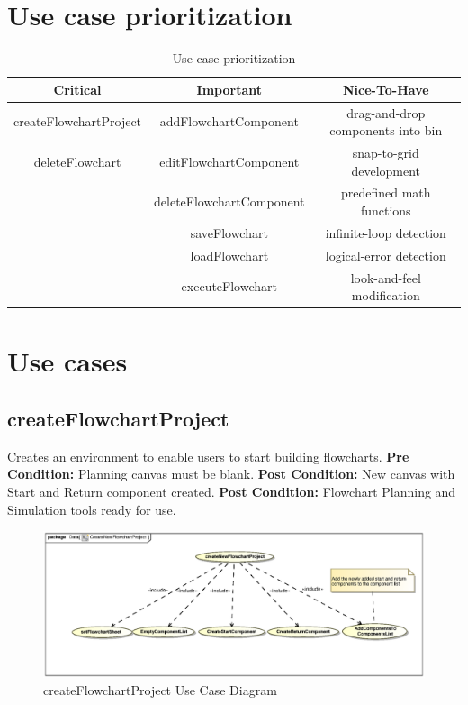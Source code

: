 \documentclass[11pt,a4paper,titlepage]{article}
\begin{document}
\newpage	
\section{Use case prioritization}


\begin{table}[h!]   
    \label{tab:table1}
    \begin{tabular}{ccc}
      \toprule
      Critical & Important & Nice-To-Have\\
      \midrule	
      createFlowchartProject & addFlowchartComponent &  drag-and-drop components into bin\\
      deleteFlowchart & editFlowchartComponent & snap-to-grid development\\
       & deleteFlowchartComponent & predefined math functions\\
       & saveFlowchart & infinite-loop detection\\
       & loadFlowchart & logical-error detection\\
       & executeFlowchart & look-and-feel modification\\
      \bottomrule     
     \end{tabular}  
    \caption{Use case prioritization}
\end{table}


\newpage
\section{Use cases}

\subsection{createFlowchartProject}
Creates an environment to enable users to start building flowcharts.\newline\newline
\textbf{Pre Condition:} Planning canvas must be blank.\newline\newline
\textbf{Post Condition:} New canvas with Start and Return component created.\newline
\textbf{Post Condition:} Flowchart Planning and Simulation tools ready for use.\newline

\begin{figure}[H]
  \centering
\includegraphics[width=500px]{createNewFlowchartProject.eps}
\caption{createFlowchartProject Use Case Diagram}
\end{figure}
\end{document}

